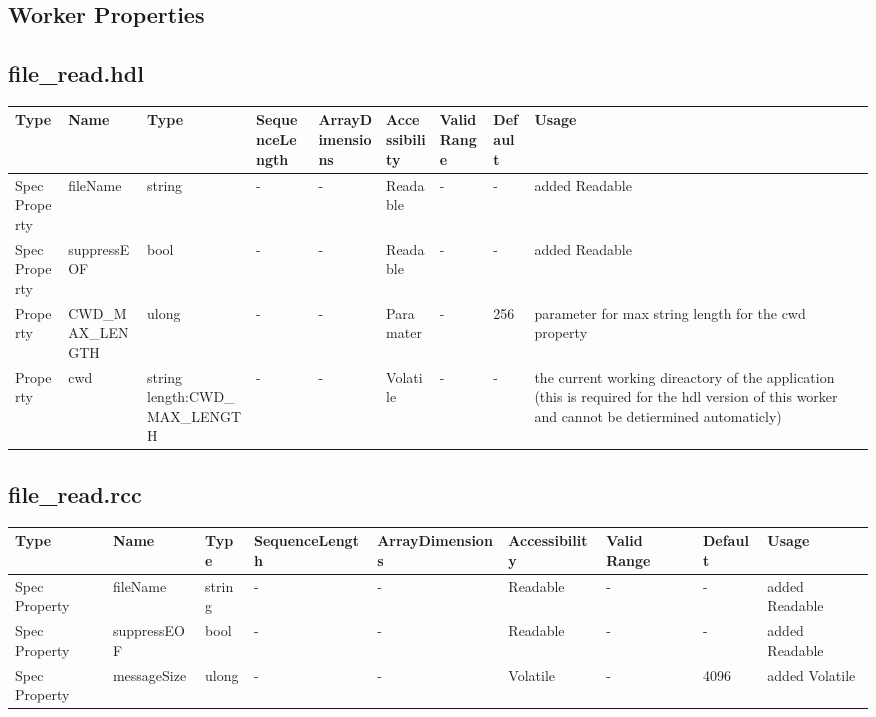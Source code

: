 \documentclass{article}
\def\comp{file\_read}
\begin{document}
\begin{landscape}
	\section*{Worker Properties}
	\subsection*{\comp.hdl}
	\begin{scriptsize}
\begin{tabular}{|p{2cm}|p{2.75cm}|p{3.5cm}|p{2cm}|p{2cm}|p{2.25cm}|p{1.5cm}|p{1cm}|p{4cm}|}
			\hline
			\rowcolor{blue}
			Type     & Name                      & Type  & SequenceLength & ArrayDimensions & Accessibility       & Valid Range & Default & Usage                                      \\
			\hline
			Spec Property & fileName & string  & - & - & Readable & -  &- & added Readable
            \\
            \hline
            Spec Property & suppressEOF & bool  & - & - & Readable & -  &- & added Readable
            \\
            \hline
            Property & CWD\_MAX\_LENGTH & ulong  & - & - & Paramater & -  & 256 & parameter for max string length for the cwd property
            \\
            \hline
            Property & cwd & string length:CWD\_MAX\_LENGTH & - & - & Volatile & -  &- & the current working direactory of the application (this is required for the hdl version of this worker and cannot be detiermined automaticly) 
            \\
            \hline
    \end{tabular}
	\end{scriptsize}
	
	\subsection*{\comp.rcc}
    \begin{scriptsize}
    \begin{tabular}{|p{2cm}|p{2.75cm}|p{1cm}|p{2.75cm}|p{2cm}|p{2.25cm}|p{2cm}|p{1cm}|p{5cm}|}
			\hline
			\rowcolor{blue}
			Type     & Name                      & Type  & SequenceLength & ArrayDimensions & Accessibility       & Valid Range & Default & Usage                                      \\
			\hline
			Spec Property & fileName & string  & - & - & Readable & -  &- & added Readable
            \\
            \hline
            Spec Property & suppressEOF & bool  & - & - & Readable & -  &- & added Readable
            \\
            \hline
            Spec Property & messageSize & ulong  & - & - &  Volatile & -  &4096 & added Volatile 
            \\
            \hline
    \end{tabular}
	\end{scriptsize}


\end{landscape}
\end{document}
